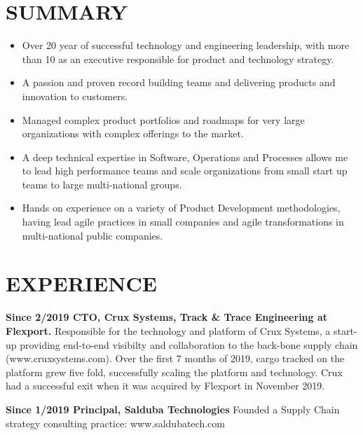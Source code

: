 \documentclass{res}
\begin{document}
\thispagestyle{empty} %


\address{51 Roslyn Avenue\https://www.overleaf.com/project/50f8ddca24a73f303b1575c2\San Carlos, Ca, 94070}
\address{+1.650.489.0329\\jmpicnic@gmail.com\\www.linkedin.com/in/mpinilla}

\begin{resume}

\section{SUMMARY}

\begin{itemize}
\item Over 20 year of successful technology and engineering leadership, with more than 10 as an executive responsible for product and technology strategy.
\item A passion and proven record building teams and delivering products and innovation to customers.
\item Managed complex product portfolios and roadmaps for very large organizations with complex offerings to the market.
\item A deep technical expertise in Software, Operations and Processes allows me to lead high performance teams and scale organizations from small start up teams to large multi-national groups.
\item Hands on experience on a variety of Product Development methodologies, having lead agile practices in small companies and agile transformations in multi-national public companies.
\end{itemize}


\section{EXPERIENCE}
{\bf Since 2/2019 CTO, Crux Systems, Track \& Trace Engineering at Flexport.} Responsible for the technology and platform of Crux Systems, a start-up providing end-to-end visibilty and collaboration to the back-bone supply chain (www.cruxsystems.com). Over the first 7 months of 2019, cargo tracked on the platform grew five fold, successfully scaling the platform and technology. Crux had a successful exit when it was acquired by Flexport in November 2019.

{\bf Since 1/2019 Principal, Salduba Technologies} Founded a Supply Chain strategy consulting practice: www.saldubatech.com


\end{resume}
\end{document}
